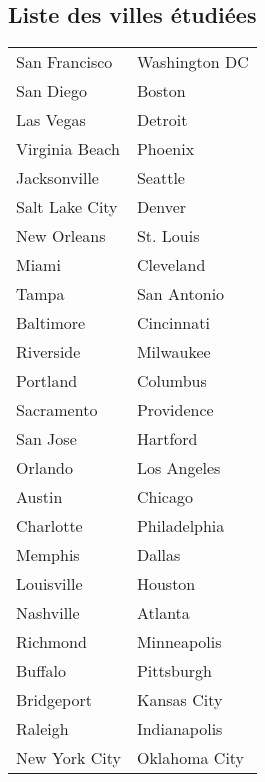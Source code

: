 \subsection{Liste des villes étudiées}
\label{annexe:1}
\begin{table}[H]
 \centering
 \begin{tabular}{l@{\hskip 5cm}l}
    San Francisco & Washington DC\\
    San Diego & Boston\\
    Las Vegas & Detroit\\
    Virginia Beach & Phoenix\\
    Jacksonville & Seattle\\
    Salt Lake City & Denver\\
    New Orleans & St. Louis\\
    Miami & Cleveland\\
    Tampa & San Antonio\\
    Baltimore & Cincinnati\\
    Riverside & Milwaukee\\
    Portland & Columbus\\
    Sacramento & Providence\\
    San Jose & Hartford\\
    Orlando & Los Angeles\\
    Austin & Chicago\\
    Charlotte & Philadelphia\\
    Memphis & Dallas\\
    Louisville & Houston\\
    Nashville & Atlanta\\
    Richmond & Minneapolis\\
    Buffalo & Pittsburgh\\
    Bridgeport & Kansas City\\
    Raleigh & Indianapolis\\
    New York City & Oklahoma City\\
 \end{tabular}
\end{table}
